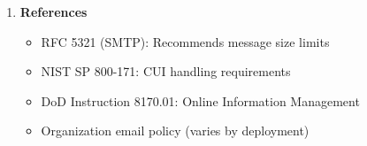 \documentclass[11pt,letterpaper]{article}
\newcommand{\dmsection}[1]{\item \textbf{#1}\par}
\begin{document}
\begin{enumerate}
\dmsection{References}

\begin{itemize}
    \item RFC 5321 (SMTP): Recommends message size limits
    \item NIST SP 800-171: CUI handling requirements
    \item DoD Instruction 8170.01: Online Information Management
    \item Organization email policy (varies by deployment)
\end{itemize}

\end{enumerate}
\end{document}
